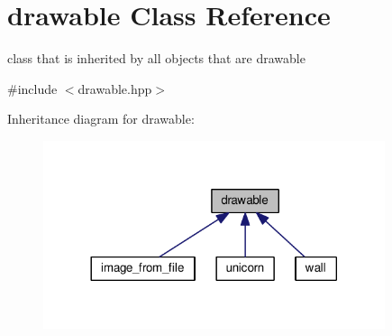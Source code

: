 \hypertarget{classdrawable}{}\section{drawable Class Reference}
\label{classdrawable}


class that is inherited by all objects that are drawable  




{\ttfamily \#include $<$drawable.\+hpp$>$}



Inheritance diagram for drawable\+:\nopagebreak
\begin{figure}[H]
\begin{center}
\leavevmode
\includegraphics[width=284pt]{classdrawable__inherit__graph}
\end{center}
\end{figure}
